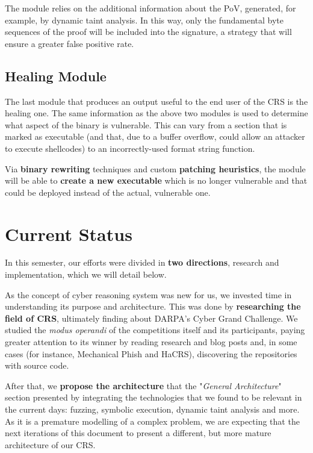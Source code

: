 \documentclass[12pt,a4paper,english,onecolumn]{IEEEtran}
\begin{document}
The module relies on the additional information about the PoV, generated, for example, by dynamic taint analysis. In this way, only the fundamental byte sequences of the proof will be included into the signature, a strategy that will ensure a greater false positive rate.

\subsection{Healing Module}

The last module that produces an output useful to the end user of the CRS is the healing one. The same information as the above two modules is used to determine what aspect of the binary is vulnerable. This can vary from a section that is marked as executable (and that, due to a buffer overflow, could allow an attacker to execute shellcodes) to an incorrectly-used format string function.

Via \textbf{binary rewriting} techniques and custom \textbf{patching heuristics}, the module will be able to \textbf{create a new executable} which is no longer vulnerable and that could be deployed instead of the actual, vulnerable one.

\section{Current Status}

In this semester, our efforts were divided in \textbf{two directions}, research and implementation, which we will detail below.

As the concept of cyber reasoning system was new for us, we invested time in understanding its purpose and architecture. This was done by \textbf{researching the field of CRS}, ultimately finding about DARPA's Cyber Grand Challenge. We studied the \textit{modus operandi} of the competitions itself and its participants, paying greater attention to its winner by reading research and blog posts and, in some cases (for instance, Mechanical Phish and HaCRS), discovering the repositories with source code.

After that, we \textbf{propose the architecture} that the "\textit{General Architecture}" section presented by integrating the technologies that we found to be relevant in the current days: fuzzing, symbolic execution, dynamic taint analysis and more. As it is a premature modelling of a complex problem, we are expecting that the next iterations of this document to present a different, but more mature architecture of our CRS.
\end{document}
